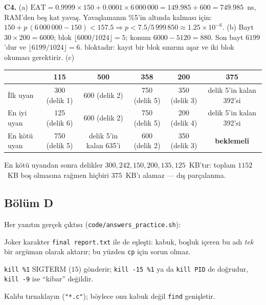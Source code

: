 \documentclass[11pt,a4paper]{article}
\newcommand{\cmd}[1]{\texttt{#1}}
\begin{document}
\textbf{C4.} (a) $\text{EAT} = 0.9999 \times 150 + 0.0001 \times 6\,000\,000 = 149.985 + 600 = 749.985$~ns, RAM'den beş kat yavaş. Yavaşlamanın \%5'in altında kalması için: $150 + p\,(6\,000\,000 - 150) < 157.5 \Rightarrow p < 7.5/5\,999\,850 \approx 1.25 \times 10^{-6}$. (b) Bayt $30 \times 200 = 6000$; blok $\lfloor 6000/1024 \rfloor = 5$; konum $6000 - 5120 = 880$. Son bayt $6199$'dur ve $\lfloor 6199/1024 \rfloor = 6$. bloktadır: kayıt bir blok sınırını aşar ve iki blok okuması gerektirir. (c)
\begin{center}
\small
\renewcommand{\arraystretch}{1.15}
\begin{tabular}{@{}lccccc@{}}
\toprule
& \textbf{115} & \textbf{500} & \textbf{358} & \textbf{200} & \textbf{375} \\
\midrule
İlk uyan & 300 (delik 1) & 600 (delik 2) & 750 (delik 5) & 350 (delik 3) & delik 5'in kalan 392'si \\
En iyi uyan & 125 (delik 6) & 600 (delik 2) & 750 (delik 5) & 200 (delik 4) & delik 5'in kalan 392'si \\
En kötü uyan & 750 (delik 5) & delik 5'in kalan 635'i & 600 (delik 2) & 350 (delik 3) & \textbf{beklemeli} \\
\bottomrule
\end{tabular}
\end{center}
En kötü uyandan sonra delikler $300, 242, 150, 200, 135, 125$~KB'tır: toplam $1152$~KB boş olmasına rağmen hiçbiri $375$~KB'ı alamaz --- dış parçalanma.

\subsection*{Bölüm D}
Her yanıtın gerçek çıktısı (\texttt{code/answers\_practice.sh}):



Joker karakter \texttt{final report.txt} ile de eşleşti: kabuk, boşluk içeren bu adı \emph{tek} bir argüman olarak aktarır; bu yüzden \cmd{cp} için sorun olmaz.



\cmd{kill \%1} SIGTERM ($15$) gönderir; \cmd{kill -15 \%1} ya da \cmd{kill PID} de doğrudur, \cmd{kill -9} ise ``kibar'' değildir.

Kalıbı tırnaklayın (\texttt{"*.c"}); böylece onu kabuk değil \cmd{find} genişletir.
\end{document}

